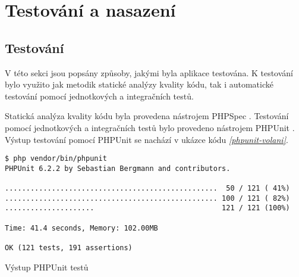 \chapter{Testování a nasazení}

\section{Testování}
V této sekci jsou popsány způsoby, jakými byla aplikace testována. K testování bylo využito jak metodik statické analýzy kvality kódu, tak i automatické testování pomocí jednotkových a integračních testů.

Statická analýza kvality kódu byla provedena nástrojem PHPSpec \autocite{phpsec}. Testování pomocí jednotkových a integračních testů bylo provedeno nástrojem PHPUnit \autocite{phpunit}.
Výstup testování pomocí PHPUnit se nachází v ukázce kódu \emph{\ref{phpunit-volani}}. 


\begin{listing}[htbp]
        \begin{verbatim}
$ php vendor/bin/phpunit 
PHPUnit 6.2.2 by Sebastian Bergmann and contributors.

..................................................  50 / 121 ( 41%)
.................................................. 100 / 121 ( 82%)
.....................                              121 / 121 (100%)

Time: 41.4 seconds, Memory: 102.00MB

OK (121 tests, 191 assertions)
        \end{verbatim}
    \caption{Výstup PHPUnit testů \label{phpunit-volani}}
\end{listing}










